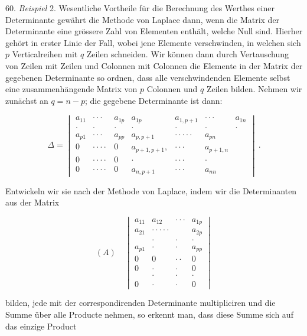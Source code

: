 \documentclass[11pt]{article}
\providecommand{\weberpage}[1]{}
\let\Delta\varDelta
\begin{document}
60. \textit{Beispiel} 2. Wesentliche Vortheile f\"ur die Berechnung des Werthes einer
Determinante gew\"ahrt die Methode von Laplace dann, wenn die Matrix der Determinante eine
gr\"ossere Zahl von Elementen enth\"alt, welche Null sind. Hierher geh\"ort in erster Linie
der Fall, wobei jene Elemente verschwinden, in welchen sich $p$ Verticalreihen mit $q$
Zeilen schneiden. Wir k\"onnen dann durch Vertauschung von Zeilen mit Zeilen und Colonnen mit
Colonnen die Elemente in der Matrix der gegebenen Determinante so ordnen, dass alle
verschwindenden Elemente selbst eine zusammenh\"angende Matrix von $p$ Colonnen und $q$
Zeilen bilden. Nehmen wir zun\"achst an $q = n - p$; die gegebene Determinante ist dann:

\[
\Delta = \begin{vmatrix}
a_{11} & \cdot\cdot\cdot & a_{1p} & a_{1p} & a_{1,p+1} & \cdot\cdot\cdot & a_{1n} \\
\cdot & \cdot & \cdot & \cdot & \cdot & \cdot & \cdot \\
a_{p1} & \cdot\cdot\cdot & a_{pp} & a_{p,p+1} & \cdot\cdot\cdot\cdot\cdot & a_{pn} \\
0 & \cdot\cdot\cdot\cdot & 0 & a_{p+1,p+1}, & \cdot\cdot\cdot & a_{p+1,n} \\
0 & \cdot\cdot\cdot\cdot & 0 & \cdot & \cdot\cdot\cdot & \cdot \\
0 & \cdot\cdot\cdot\cdot & 0 & a_{n,p+1} & \cdot\cdot\cdot & a_{nn}
\end{vmatrix}\ .
\]


\weberpage{66}
Entwickeln wir sie nach der Methode von Laplace, indem wir die Determinanten aus der Matrix

\[
(A)\quad
\begin{vmatrix}
a_{11} & a_{12} & \cdot\cdot\cdot & a_{1p} \\
a_{21} & \cdot\cdot\cdot\cdot\cdot & & a_{2p} \\
& \cdot & \cdot & \cdot \\
a_{p1} & \cdot & \cdot & a_{pp} \\
0 & 0 & \cdot\cdot & 0 \\
0 & \cdot & \cdot & 0 \\
& \cdot & \cdot & \cdot \\
0 & \cdot & \cdot & 0
\end{vmatrix}
\]

bilden, jede mit der correspondirenden Determinante multipliciren und die Summe \"uber alle
Producte nehmen, so erkennt man, dass diese Summe sich auf das einzige Product
\end{document}
